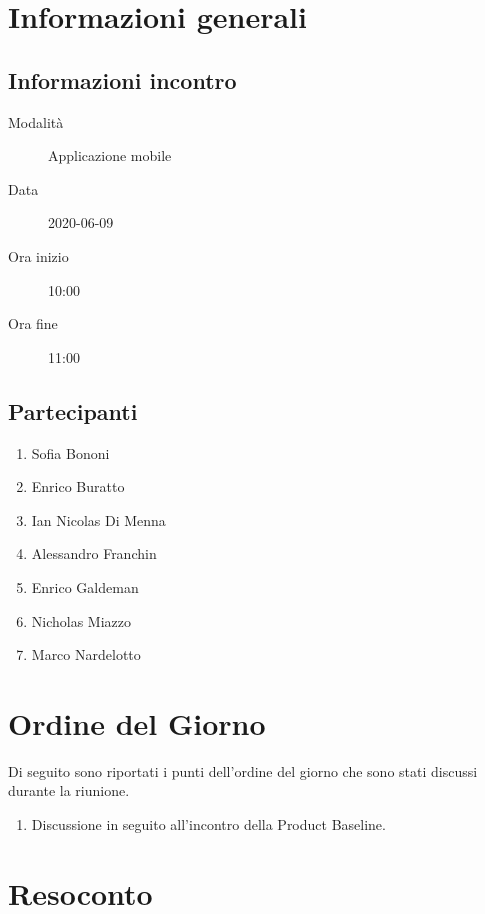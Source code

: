 \documentclass{article}
\begin{document}


\section{Informazioni generali}%
\label{sec:informazioni_generali}

\subsection{Informazioni incontro}%
\label{sub:informazioni_incontro}

\begin{description}
  \item[Modalità] Applicazione mobile 
  \item[Data] 2020-06-09
  \item[Ora inizio] 10:00
  \item[Ora fine] 11:00
\end{description}

\subsection{Partecipanti}%
\label{sub:partecipanti}

\begin{enumerate}
  \item Sofia Bononi
  \item Enrico Buratto
  \item Ian Nicolas Di Menna
  \item Alessandro Franchin
  \item Enrico Galdeman
  \item Nicholas Miazzo
  \item Marco Nardelotto
\end{enumerate}

\section{Ordine del Giorno}%
\label{ordine_del_giorno}
Di seguito sono riportati i punti dell'ordine del giorno che sono stati discussi durante la riunione.
\begin{enumerate}
  \item Discussione in seguito all'incontro della Product Baseline.
\end{enumerate}

\section{Resoconto}%
\label{resoconto}
\end{document}
